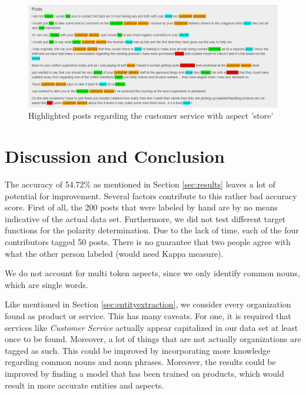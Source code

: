 \documentclass[10pt,a4paper]{article}
\begin{document}
		\begin{figure}[h]
			\centering
			\includegraphics[width=0.9\linewidth]{data/posts}
			\caption{Highlighted posts regarding the customer service with aspect 'store'}
			\label{fig:posts}
		\end{figure}
	
	\section{Discussion and Conclusion}
	The accuracy of 54.72\% as mentioned in Section \ref{sec:results} leaves a lot of potential for improvement. Several factors contribute to this rather bad accuracy score. First of all, the 200 posts that were labeled by hand are by no means indicative of the actual data set. Furthermore, we did not test different target functions for the polarity determination. Due to the lack of time, each of the four contributors tagged 50 posts. There is no guarantee that two people agree with what the other person labeled (would need Kappa measure).

	We do not account for multi token aspects, since we only identify common nouns, which are single words.

	Like mentioned in Section \ref{sec:entityextraction}, we consider every organization found as product or service. This has many caveats. For one, it is required that services like \textit{Customer Service} actually appear capitalized in our data set at least once to be found. Moreover, a lot of things that are not actually organizations are tagged as such. This could be improved by incorporating more knowledge regarding common nouns and noun phrases.
	Moreover, the results could be improved by finding a model that has been trained on products, which would result in more accurate entities and aspects.
	
\end{document}
